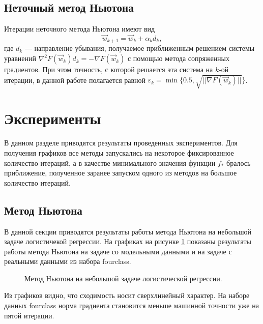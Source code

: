 \documentclass[12pt]{article}
\begin{document}
	\subsection{Неточный метод Ньютона}
	\hspace{0.6cm} Итерации неточного метода Ньютона имеют вид
	$$ \vec w_{k+1} = \vec w_k + \alpha_k d_k,$$
	где $d_k$ — направление убывания, получаемое приближенным решением системы уравнений $\nabla^2 F(\vec w_k) d_k = -\nabla F(\vec w_k)$ с помощью метода сопряженных градиентов. При этом точность, с которой решается эта система на $k$-ой итерации, в данной работе полагается равной $\varepsilon_k = \min\{ 0.5, \sqrt{|| \nabla F(\vec w_k)||}\}$.


\section{Эксперименты}

\hspace{0.6cm}В данном разделе приводятся результаты проведенных экспериментов. Для получения графиков все методы запускались на некоторое фиксированное количество итераций, а в качестве минимального значения функции $f_*$ бралось приближение, полученное заранее запуском одного из методов на большое количество итераций.

	\subsection{Метод Ньютона}
	
	\hspace{0.6cm}В данной секции приводятся результаты работы метода Ньютона на небольшой задаче логистичекой регрессии. На графиках на рисунке \ref{newton} показаны результаты работы метода Ньютона на задаче со модельными данными и на задаче с реальными данными из набора fourclass.
	
\begin{figure}[!h]
	\centering
	\subfloat{
		\scalebox{0.9}{
			
		}
	}
	\subfloat{
		\scalebox{0.9}{
                		
		}
	}
	\caption{Метод Ньютона на небольшой задаче логистической регрессии.}
	\label{newton}
\end{figure}

	Из графиков видно, что сходимость носит сверхлинейный характер. На наборе данных fourclass норма градиента становится меньше машинной точности уже на пятой итерации.
	
	\pagebreak
\end{document}
